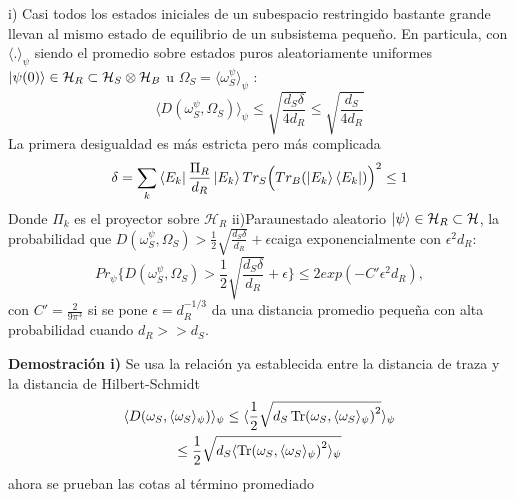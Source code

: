 \begin{theorem}
i) Casi todos los estados iniciales de un subespacio restringido bastante grande llevan al mismo estado de equilibrio de un subsistema pequeño. En particula, con $\langle .\rangle_{\psi}$ siendo el promedio sobre estados puros aleatoriamente uniformes $\ket{\psi(0)} \in \mathcal{H}_{R} \subset \mathcal{H}_{S} \otimes \mathcal{H}_{B}$ u $\Omega_{S}= \langle \omega_{S}^{\psi} \rangle_{\psi}$ :
\begin{equation}
\langle D(\omega_{S}^{\psi}, \Omega_{S}) \rangle_{\psi} \leq \sqrt{\frac{d_{S} \delta}{4d_{R}}} \leq \sqrt{\frac{d_{S}}{4d_{R}}}
\end{equation}
La primera desigualdad es más estricta pero más complicada 
\begin{equation}
\delta= \sum_{k}\bra{E_{k}}\frac{\Pi_{R}}{d_{R}}\ket{E_{k}} Tr_{S} \Big( Tr_{B} (\ket{E_{k}} \bra{E_{k}}) \Big)^{2} \leq  1
\end{equation}
Donde $\Pi_{k}$ es el proyector sobre $\mathcal{H}_{R}$
ii)Paraunestado aleatorio $\ket{\psi} \in \mathcal{H}_{R}\subset \mathcal{H}$, la probabilidad que $D(\omega_{S}^{\psi},\Omega_{S}) > \frac{1}{2} \sqrt{\frac{d_{S} \delta}{d_{R}}}+ \epsilon$caiga exponencialmente con $\epsilon^{2}d_{R}$:
\begin{equation}
Pr_{\psi} \{ D(\omega_{S}^{\psi}, \Omega_{S}) > \frac{1}{2}\sqrt{\frac{d_{S} \delta}{d_{R}}} + \epsilon \} \leq 2exp(-C'\epsilon^{2}d_{R}),
\end{equation}
con $C'=\frac{2}{9 \pi^{3}}$ si se pone $\epsilon=d_{R}^{-1/3}$ da una distancia promedio pequeña con alta probabilidad cuando $d_{R}>>d_{S}$.
\end{theorem}

\textbf{Demostración i)}
Se usa la relación ya establecida entre la distancia de traza y la distancia de Hilbert-Schmidt
\begin{multline}
\langle D(\omega_{S}, \langle \omega_{S} \rangle_{\psi}) \rangle_{\psi} \leq \langle \frac{1}{2} \sqrt{d_{S} \Tr (\omega_{S}, \langle \omega_{S} \rangle_{\psi})^{2}} \rangle_{\psi}\\
\leq \frac{1}{2} \sqrt{d_{S} \langle \Tr (\omega_{S}, \langle \omega_{S} \rangle_{\psi})^{2} \rangle_{\psi}}
\end{multline}
ahora se prueban las cotas al término promediado

